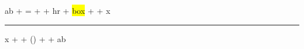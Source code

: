 ab + {=}\llap{/\,} + \mathrlap{\,/}{=} + hr + \colorbox{yellow}{box} +  + x\rule[2pt]{1em}{0.5em}x +  + \left(\right) +  + a\hphantom{xx}b
